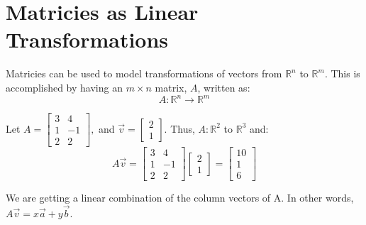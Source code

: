 \documentclass[../main.tex]{subfiles}
\begin{document}
\section{Matricies as Linear Transformations}

Matricies can be used to model transformations of vectors from \( \mathbb{R}^n \) to \( \mathbb{R}^m \).
This is accomplished by having an \( m \times n \) matrix, \( A \), written as: \[ A: \mathbb{R}^n \rightarrow \mathbb{R}^m \]

\begin{example}
    
    Let \( A = \begin{bmatrix}
        3 & 4 \\
        1 & -1 \\
        2 & 2 
    \end{bmatrix}, \) and
    \( \vec{v} = \begin{bmatrix}
        2 \\
        1
    \end{bmatrix} \).
    Thus, \( A: \mathbb{R}^2 \) to \( \mathbb{R}^3 \) and:
    \[
        A\vec{v} = \begin{bmatrix}
            3 & 4 \\
            1 & -1 \\
            2 & 2 
        \end{bmatrix}
        \begin{bmatrix}
            2 \\
            1
        \end{bmatrix}
        =
        \begin{bmatrix}
            10 \\
            1 \\
            6
        \end{bmatrix}
    \]

    \begin{note}
        We are getting a linear combination of the column vectors of A.
        In other words, \( A \vec{v} = x \vec{a}+ y \vec{b} \).
    \end{note}
\end{example}
\end{document}
